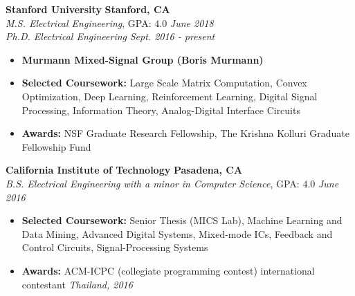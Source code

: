 \documentclass{article}
\newenvironment{changemargin}[2]{%
  \begin{list}{}{%
    \setlength{\topsep}{0pt}%
    \setlength{\leftmargin}{#1}%
    \setlength{\rightmargin}{#2}%
    \setlength{\listparindent}{\parindent}%
    \setlength{\itemindent}{\parindent}%
    \setlength{\parsep}{\parskip}%
  }%
  \item[]}{\end{list}
}
\newenvironment{body} {
	\vspace*{-16pt}
	\begin{changemargin}{-0.25in}{-0.5in}
  }	
	{\end{changemargin}
}
\begin{document}
\begin{body}
	\vspace{14pt}
	\textbf{Stanford University} \hfill \textbf{Stanford, CA} \\
	\emph{M.S. Electrical Engineering}, GPA: $4.0$ \hfill \emph{June 2018} \\
	\emph{Ph.D. Electrical Engineering} \hfill \emph{Sept. 2016 - present} \\
	\begin{itemize}
	\item \textbf{Murmann Mixed-Signal Group (Boris Murmann)} \\
	\item \textbf{Selected Coursework:} Large Scale Matrix Computation, Convex Optimization, Deep Learning, Reinforcement Learning, Digital Signal Processing, Information Theory, Analog-Digital Interface Circuits
	\item \textbf{Awards:} NSF Graduate Research Fellowship, The Krishna Kolluri Graduate Fellowship Fund
	\end{itemize}

	\smallskip

	\textbf{California Institute of Technology} \hfill \textbf{Pasadena, CA} \\
	\emph{B.S. Electrical Engineering with a minor in Computer Science}, GPA: $4.0$ \hfill \emph{June 2016} \\
	\begin{itemize}
	\item \textbf{Selected Coursework:} Senior Thesis (MICS Lab), Machine Learning and Data Mining, Advanced Digital Systems, Mixed-mode ICs, Feedback and Control Circuits, Signal-Processing Systems
	\item \textbf{Awards:} ACM-ICPC (collegiate programming contest) international contestant \textit{Thailand, 2016}%
	\end{itemize}


\end{body}
\end{document}
